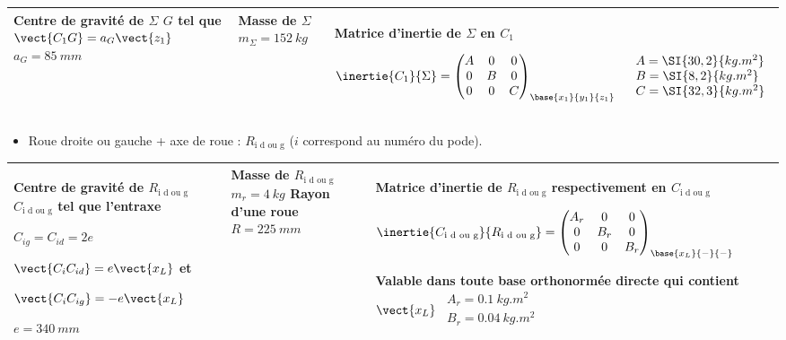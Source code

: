 \begin{center}
\begin{tabular}{|p{4cm}|p{4cm}|p{8cm}|}
\hline
Centre de gravité de $\Sigma$ 
$G$ tel que $\vect{C_1G}=a_G\vect{z_1}$
$a_G =\SI{85}{mm}$
& 
Masse de $\Sigma$ $m_{\Sigma}=\SI{152}{kg}$
& 
Matrice d'inertie de $\Sigma$ en $C_1$ 

$\inertie{C_1}{\Sigma}=
\begin{pmatrix} 
A & 0 & 0 \\ 0 & B & 0 \\ 0 & 0 & C 
\end{pmatrix}_{\base{x_1}{y_1}{z_1}}
\quad 
\begin{array}{l}
A =\SI{30,2}{kg.m^2} \\
B =\SI{8,2}{kg.m^2} \\
C =\SI{32,3}{kg.m^2} \\
\end{array}$ \\
\hline
\end{tabular}
\end{center}


\begin{itemize}
\item Roue droite ou gauche + axe de roue : $R_{\text{i d ou g}}$ ($i$ correspond au numéro du pode).
\end{itemize}

\begin{center}
\begin{tabular}{|p{4cm}|p{4cm}|p{8cm}|}
\hline
Centre de gravité de $R_{\text{i d ou g}}$ $C_{\text{i d ou g}}$ tel que l'entraxe

$C_{ig}=C_{id}=2e$ 

$\vect{C_i C_{id}}=e\vect{x_L}$ et 

$\vect{C_i C_{ig}}=-e\vect{x_L}$ 

$e=\SI{340}{mm}$ 
&
Masse de $R_{\text{i d ou g}}$ $m_r = \SI{4}{kg}$
Rayon d'une roue $R=\SI{225}{mm}$
& 
Matrice d'inertie de $R_{\text{i d ou g}}$ respectivement en  $C_{\text{i d ou g}}$ 

$\inertie{C_{\text{i d ou g}}}{R_{\text{i d ou g}}}=
\begin{pmatrix} 
A_r & 0 & 0 \\ 0 & B_r & 0 \\ 0 & 0 & B_r 
\end{pmatrix}_{\base{x_L}{-}{-}}$

Valable dans toute base orthonormée directe qui contient $\vect{x_L}$
$
\begin{array}{l}
A_r =\SI{0,1}{kg.m^2} \\
B_r =\SI{0,04}{kg.m^2} \\
\end{array}$\\
\hline
\end{tabular}
\end{center}

